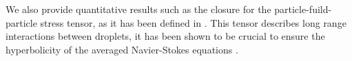 \documentclass{icnmmf5}
\begin{document}


We also provide quantitative results such as the closure for the particle-fuild-particle stress tensor, as it has been defined in \cite{zhang2021ensemble}. 
This tensor describes long range interactions between droplets, it has been shown to be crucial to ensure the hyperbolicity of the averaged Navier-Stokes equations \cite{fox2020hyperbolic}. %


\end{document}
